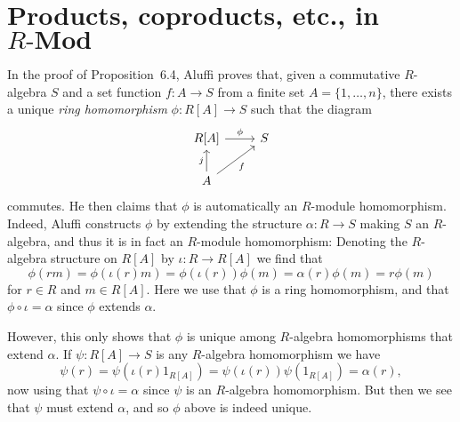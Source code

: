 \documentclass[article, a4paper, 11pt, oneside]{memoir}
\numberwithin{equation}{chapter}
\newcommand{\scat}[1]{\mathbf{#1}} %
\newcommand{\catMod}[1]{{#1\text{-}\scat{Mod}}}
\newcommand{\catRMod}{\catMod{R}}
\theoremstyle{nonumberplain}
\begin{document}
\section[Products, coproducts, etc., in R-Mod][Products, coproducts, etc., in $\catRMod$]{Products, coproducts, etc., in $\catRMod$}

\begin{remarkbreak}
    In the proof of Proposition~6.4, Aluffi proves that, given a commutative $R$-algebra $S$ and a set function $f \colon A \to S$ from a finite set $A = \{1, \ldots, n\}$, there exists a unique \emph{ring homomorphism} $\phi \colon R[A] \to S$ such that the diagram
    \begin{equation*}
        \begin{tikzcd}
            R[A]
                \ar[r, "\phi"]
            & S
            \\
            A
                \ar[u, "j"]
                \ar[ur, "f", swap]
        \end{tikzcd}
    \end{equation*}
    commutes. He then claims that $\phi$ is automatically an $R$-module homomorphism. Indeed, Aluffi constructs $\phi$ by extending the structure $\alpha \colon R \to S$ making $S$ an $R$-algebra, and thus it is in fact an $R$-module homomorphism: Denoting the $R$-algebra structure on $R[A]$ by $\iota \colon R \to R[A]$ we find that
    \begin{equation*}
        \phi(rm)
            = \phi(\iota(r)m)
            = \phi(\iota(r)) \phi(m)
            = \alpha(r) \phi(m)
            = r \phi(m)
    \end{equation*}
    for $r \in R$ and $m \in R[A]$. Here we use that $\phi$ is a ring homomorphism, and that $\phi \circ \iota = \alpha$ since $\phi$ extends $\alpha$.

    However, this only shows that $\phi$ is unique among $R$-algebra homomorphisms that extend $\alpha$. If $\psi \colon R[A] \to S$ is any $R$-algebra homomorphism we have
    \begin{equation*}
        \psi(r)
            = \psi(\iota(r) 1_{R[A]})
            = \psi(\iota(r)) \psi(1_{R[A]})
            = \alpha(r),
    \end{equation*}
    now using that $\psi \circ \iota = \alpha$ since $\psi$ is an $R$-algebra homomorphism. But then we see that $\psi$ must extend $\alpha$, and so $\phi$ above is indeed unique.
\end{remarkbreak}
\end{document}
